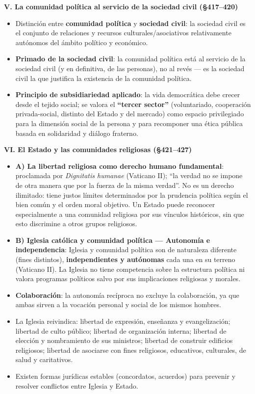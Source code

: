 \documentclass[10pt,a4paper]{article}
\begin{document}
\medskip\noindent \textbf{V. La comunidad política al servicio de la sociedad civil (\S{}417--420)}\par\nopagebreak
\begin{itemize}
\item Distinción entre \textbf{comunidad política} y \textbf{sociedad civil}: la sociedad civil es el conjunto de relaciones y recursos culturales/asociativos relativamente autónomos del ámbito político y económico.
\item \textbf{Primado de la sociedad civil}: la comunidad política está al servicio de la sociedad civil (y en definitiva, de las personas), no al revés --- es la sociedad civil la que justifica la existencia de la comunidad política.
\item \textbf{Principio de subsidiariedad aplicado}: la vida democrática debe crecer desde el tejido social; se valora el \textbf{``tercer sector''} (voluntariado, cooperación privada-social, distinto del Estado y del mercado) como espacio privilegiado para la dimensión social de la persona y para recomponer una ética pública basada en solidaridad y diálogo fraterno.
\end{itemize}

\medskip\noindent \textbf{VI. El Estado y las comunidades religiosas (\S{}421--427)}\par\nopagebreak
\begin{itemize}
\item \textbf{A) La libertad religiosa como derecho humano fundamental}: proclamada por \textit{Dignitatis humanae} (Vaticano II); ``la verdad no se impone de otra manera que por la fuerza de la misma verdad''. No es un derecho ilimitado: tiene justos límites determinados por la prudencia política según el bien común y el orden moral objetivo. Un Estado puede reconocer especialmente a una comunidad religiosa por sus vínculos históricos, sin que esto discrimine a otros grupos religiosos.
\item \textbf{B) Iglesia católica y comunidad política --- Autonomía e independencia}: Iglesia y comunidad política son de naturaleza diferente (fines distintos), \textbf{independientes y autónomas} cada una en su terreno (Vaticano II). La Iglesia no tiene competencia sobre la estructura política ni valora programas políticos salvo por sus implicaciones religiosas y morales.
\item \textbf{Colaboración}: la autonomía recíproca no excluye la colaboración, ya que ambas sirven a la vocación personal y social de los mismos hombres.
\item La Iglesia reivindica: libertad de expresión, enseñanza y evangelización; libertad de culto público; libertad de organización interna; libertad de elección y nombramiento de sus ministros; libertad de construir edificios religiosos; libertad de asociarse con fines religiosos, educativos, culturales, de salud y caritativos.
\item Existen formas jurídicas estables (concordatos, acuerdos) para prevenir y resolver conflictos entre Iglesia y Estado.
\end{itemize}
\end{document}
